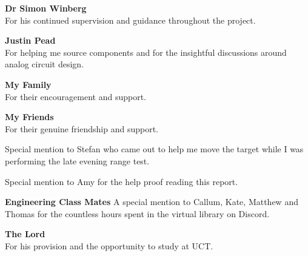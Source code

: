 \textbf{Dr Simon Winberg}\\
For his continued supervision and guidance throughout the project.

\textbf{Justin Pead}\\
For helping me source components and for the insightful discussions around analog circuit design.

\textbf{My Family}\\
For their encouragement and support.

\textbf{My Friends}\\
For their genuine friendship and support.

Special mention to Stefan who came out to help me move the target while I was performing the late evening range test.

Special mention to Amy for the help proof reading this report.

\textbf{Engineering Class Mates}
A special mention to Callum, Kate, Matthew and Thomas for the countless hours spent in the virtual library on Discord.

\textbf{The Lord}\\
For his provision and the opportunity to study at UCT.


